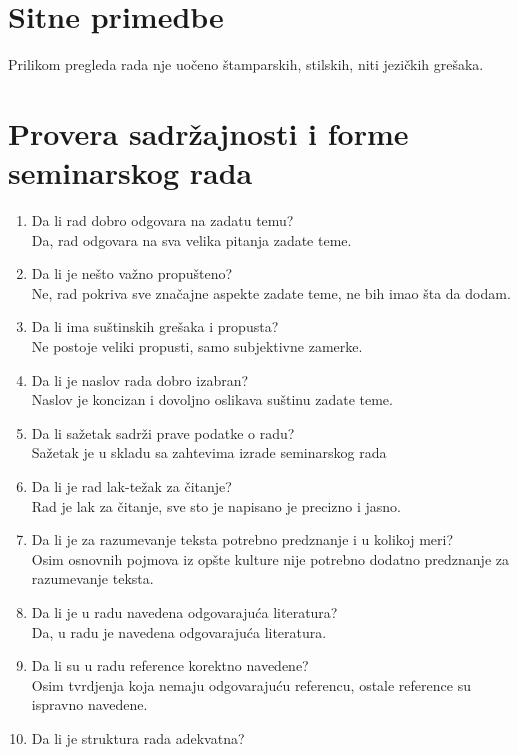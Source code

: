 \documentclass[a4paper]{report}
\begin{document}
\section{Sitne primedbe}

Prilikom pregleda rada nje uočeno štamparskih, stilskih, niti jezičkih grešaka.

\section{Provera sadržajnosti i forme seminarskog rada}

\begin{enumerate}
\item Da li rad dobro odgovara na zadatu temu?\\
Da, rad odgovara na sva velika pitanja zadate teme.
\item Da li je nešto važno propušteno?\\
Ne, rad pokriva sve značajne aspekte zadate teme, ne bih imao šta da dodam. 
\item Da li ima suštinskih grešaka i propusta?\\
Ne postoje veliki propusti, samo subjektivne zamerke.
\item Da li je naslov rada dobro izabran?\\
Naslov je koncizan i dovoljno oslikava suštinu zadate teme.
\item Da li sažetak sadrži prave podatke o radu?\\
Sažetak je u skladu sa zahtevima izrade seminarskog rada
\item Da li je rad lak-težak za čitanje?\\
Rad je lak za čitanje, sve sto je napisano je precizno i jasno.
\item Da li je za razumevanje teksta potrebno predznanje i u kolikoj meri?\\
Osim osnovnih pojmova iz opšte kulture nije potrebno dodatno predznanje za razumevanje teksta.
\item Da li je u radu navedena odgovarajuća literatura?\\
Da, u radu je navedena odgovarajuća literatura.
\item Da li su u radu reference korektno navedene?\\
Osim tvrdjenja koja nemaju odgovarajuću referencu, ostale reference su ispravno navedene. 
\item Da li je struktura rada adekvatna?\\

\end{enumerate}
\end{document}
